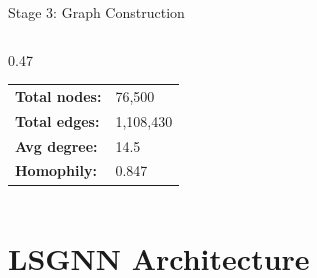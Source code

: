 \documentclass[aspectratio=169, 10pt]{beamer}
\begin{document}
\begin{frame}{Stage 3: Graph Construction}
\begin{columns}[T]
\begin{column}{0.47\textwidth}

\vspace{0.3cm}
\small
\begin{tabular}{ll}
\textbf{Total nodes:} & 76{,}500 \\
\textbf{Total edges:} & 1{,}108{,}430 \\
\textbf{Avg degree:} & 14.5 \\
\textbf{Homophily:} & 0.847 \\
\end{tabular}
\end{column}
\end{columns}
\end{frame}

\section{LSGNN Architecture}
\end{document}

